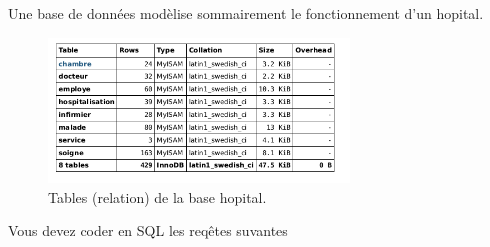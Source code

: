 Une base de données modèlise sommairement le fonctionnement d'un hopital. 
\begin{figure}[h]
  \centering
  \includegraphics[width=8cm]{./Ehopital_1.png}
  \caption{Tables (relation) de la base \og hopital\fg.}
  \label{fig:hop_1}
\end{figure}

Vous devez coder en SQL les reqêtes suvantes 

